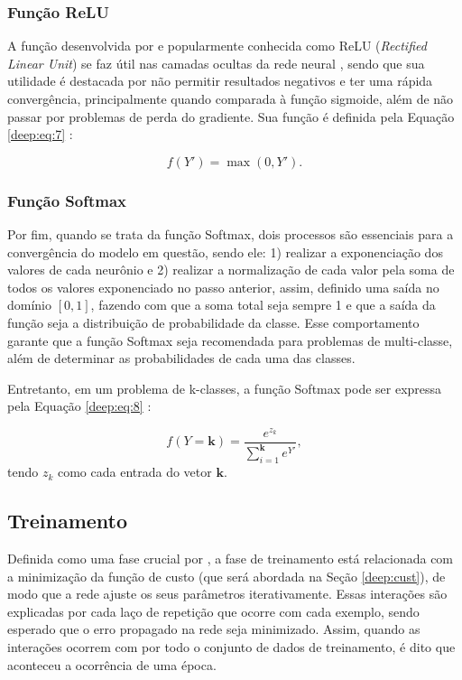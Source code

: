 \subsubsection{Função ReLU}
A função desenvolvida por \cite{Hahnioser2000} e popularmente conhecida como ReLU (\textit{Rectified Linear Unit}) se faz útil nas camadas ocultas da rede neural \citep{Goodfellow2016}, sendo que sua utilidade é destacada por não permitir resultados negativos \citep{Dahl2013} e ter uma rápida convergência, principalmente quando comparada à função sigmoide, além de não passar por problemas de perda do gradiente. Sua função é definida pela Equação \ref{deep:eq:7} \citep{Hahnioser2000}:

\begin{equation}
    \label{deep:eq:7}
    f(Y') = \max(0,Y').
\end{equation}

\subsubsection{Função Softmax}
\label{deep:soft}
Por fim, quando se trata da função Softmax, dois processos são essenciais para a convergência do modelo em questão, sendo ele: 1) realizar a exponenciação dos valores de cada neurônio e 2) realizar a normalização de cada valor pela soma de todos os valores exponenciado no passo anterior, assim, definido uma saída no domínio $[0,1]$, fazendo com que a soma total seja sempre 1 \citep{kotu2018data} e que a saída da função seja a distribuição de probabilidade da classe. Esse comportamento garante que a função Softmax seja recomendada para problemas de multi-classe, além de determinar as probabilidades de cada uma das classes.

Entretanto, em um problema de k-classes, a função Softmax pode ser expressa pela Equação \ref{deep:eq:8} \citep{kotu2018data}:

\begin{equation}
    \label{deep:eq:8}
    f(Y = \boldsymbol{k}) = \frac{e^{z_k}}{\sum_{i=1}^{\boldsymbol{k}} e^{Y'}},
\end{equation}
tendo $z_k$ como cada entrada do vetor $\boldsymbol{k}$.


\subsection{Treinamento}
\label{deep:train}

Definida como uma fase crucial por \cite{ponti2018funciona}, a fase de treinamento está relacionada com a minimização da função de custo (que será abordada na Seção \ref{deep:cust}), de modo que a rede ajuste os seus parâmetros iterativamente. Essas interações são explicadas por cada laço de repetição que ocorre com cada exemplo, sendo esperado que o erro propagado na rede seja minimizado. Assim, quando as interações ocorrem com por todo o conjunto de dados de treinamento, é dito que aconteceu a ocorrência de uma época.

